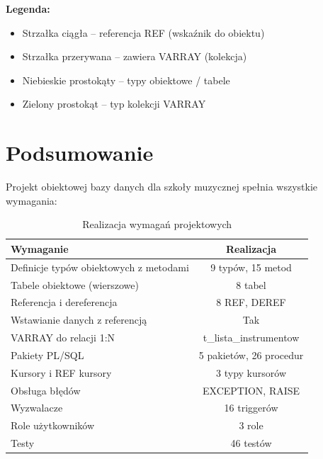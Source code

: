 \documentclass[12pt,a4paper]{article}
\begin{document}
\vspace{0.5cm}

\textbf{Legenda:}
\begin{itemize}[nosep]
    \item Strzałka ciągła -- referencja REF (wskaźnik do obiektu)
    \item Strzałka przerywana -- zawiera VARRAY (kolekcja)
    \item Niebieskie prostokąty -- typy obiektowe / tabele
    \item Zielony prostokąt -- typ kolekcji VARRAY
\end{itemize}

\section{Podsumowanie}

Projekt obiektowej bazy danych dla szkoły muzycznej spełnia wszystkie wymagania:

\begin{table}[h]
\centering
\begin{tabular}{|p{8cm}|c|}
\hline
\textbf{Wymaganie} & \textbf{Realizacja} \\
\hline
Definicje typów obiektowych z metodami & 9 typów, 15 metod \\
Tabele obiektowe (wierszowe) & 8 tabel \\
Referencja i dereferencja & 8 REF, DEREF \\
Wstawianie danych z referencją & Tak \\
VARRAY do relacji 1:N & t\_lista\_instrumentow \\
Pakiety PL/SQL & 5 pakietów, 26 procedur \\
Kursory i REF kursory & 3 typy kursorów \\
Obsługa błędów & EXCEPTION, RAISE \\
Wyzwalacze & 16 triggerów \\
Role użytkowników & 3 role \\
Testy & 46 testów \\
\hline
\end{tabular}
\caption{Realizacja wymagań projektowych}
\end{table}
\end{document}
